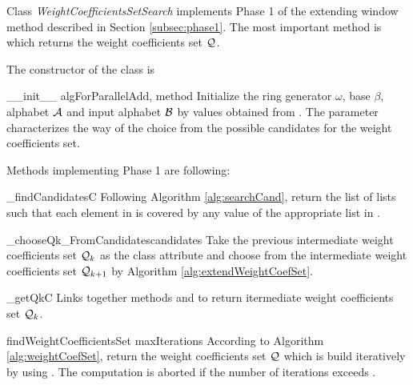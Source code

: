 Class \emph{WeightCoefficientsSetSearch} implements Phase 1 of the extending window method described in Section \ref{subsec:phase1}. The most important method is   which returns the weight coefficients set $\mathcal{Q}$.

The constructor of the class is 

\begin{method}{\_\_init\_\_}{ algForParallelAdd, method}
Initialize the ring generator $\omega$, base $\beta$, alphabet $\mathcal{A}$ and input alphabet $\mathcal{B}$ by values obtained from . The parameter  characterizes the way of the choice from the possible candidates for the weight coefficients set.  
\end{method}

Methods implementing Phase 1 are following:

\begin{method}{\_findCandidates}{C}
Following Algorithm \ref{alg:searchCand}, return the list of lists  such that each element in  is covered by any value of the appropriate list in .  
\end{method}


\begin{method}{\_chooseQk\_FromCandidates}{candidates}
Take the previous intermediate weight coefficients set $\mathcal{Q}_{k}$ as the class attribute and choose from  the intermediate weight coefficients set $\mathcal{Q}_{k+1}$ by Algorithm \ref{alg:extendWeightCoefSet}.
\end{method}


\begin{method}{\_getQk}{C}
Links together methods  and  to return itermediate weight coefficients set $\mathcal{Q}_k$.
\end{method}


\begin{method}{findWeightCoefficientsSet}{ maxIterations}
According to Algorithm \ref{alg:weightCoefSet}, return the weight coefficients set $\mathcal{Q}$ which is build iteratively by using . The computation is aborted if the number of iterations exceeds . 
\end{method}

